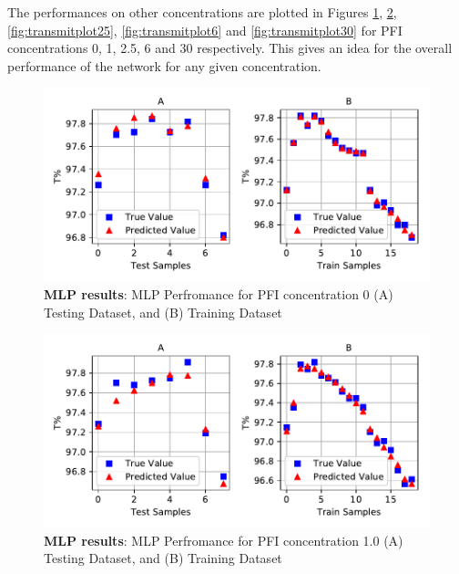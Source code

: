 \documentclass[]{article}
\begin{document}
The performances on other concentrations are plotted in Figures \ref{fig:transmitplot0}, \ref{fig:transmitplot1}, \ref{fig:transmitplot25}, \ref{fig:transmitplot6} and \ref{fig:transmitplot30} for PFI concentrations 0, 1, 2.5, 6 and 30 respectively. This gives an idea for the overall performance of the network for any given concentration.

\begin{figure}
\centering
\includegraphics{Report_files/figure-latex/transmitplot0-1.pdf}
\caption{\label{fig:transmitplot0}\textbf{MLP results}: MLP Perfromance for PFI concentration 0 (A) Testing Dataset, and (B) Training Dataset}
\end{figure}

\begin{figure}
\centering
\includegraphics{Report_files/figure-latex/transmitplot1-1.pdf}
\caption{\label{fig:transmitplot1}\textbf{MLP results}: MLP Perfromance for PFI concentration 1.0 (A) Testing Dataset, and (B) Training Dataset}
\end{figure}
\end{document}
